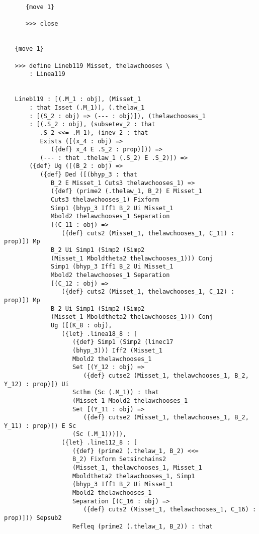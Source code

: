 \documentclass[12pt]{article}
\begin{document}
\begin{verbatim}
      {move 1}

      >>> close


   {move 1}

   >>> define Lineb119 Misset, thelawchooses \
       : Linea119


   Lineb119 : [(.M_1 : obj), (Misset_1 
       : that Isset (.M_1)), (.thelaw_1 
       : [(S_2 : obj) => (--- : obj)]), (thelawchooses_1 
       : [(.S_2 : obj), (subsetev_2 : that 
          .S_2 <<= .M_1), (inev_2 : that 
          Exists ([(x_4 : obj) => 
             ({def} x_4 E .S_2 : prop)])) => 
          (--- : that .thelaw_1 (.S_2) E .S_2)]) => 
       ({def} Ug ([(B_2 : obj) => 
          ({def} Ded ([(bhyp_3 : that 
             B_2 E Misset_1 Cuts3 thelawchooses_1) => 
             ({def} (prime2 (.thelaw_1, B_2) E Misset_1 
             Cuts3 thelawchooses_1) Fixform 
             Simp1 (bhyp_3 Iff1 B_2 Ui Misset_1 
             Mbold2 thelawchooses_1 Separation 
             [(C_11 : obj) => 
                ({def} cuts2 (Misset_1, thelawchooses_1, C_11) : prop)]) Mp 
             B_2 Ui Simp1 (Simp2 (Simp2 
             (Misset_1 Mboldtheta2 thelawchooses_1))) Conj 
             Simp1 (bhyp_3 Iff1 B_2 Ui Misset_1 
             Mbold2 thelawchooses_1 Separation 
             [(C_12 : obj) => 
                ({def} cuts2 (Misset_1, thelawchooses_1, C_12) : prop)]) Mp 
             B_2 Ui Simp1 (Simp2 (Simp2 
             (Misset_1 Mboldtheta2 thelawchooses_1))) Conj 
             Ug ([(K_8 : obj), 
                ({let} .linea18_8 : [
                   ({def} Simp1 (Simp2 (linec17 
                   (bhyp_3))) Iff2 (Misset_1 
                   Mbold2 thelawchooses_1 
                   Set [(Y_12 : obj) => 
                      ({def} cutse2 (Misset_1, thelawchooses_1, B_2, Y_12) : prop)]) Ui 
                   Scthm (Sc (.M_1)) : that 
                   (Misset_1 Mbold2 thelawchooses_1 
                   Set [(Y_11 : obj) => 
                      ({def} cutse2 (Misset_1, thelawchooses_1, B_2, Y_11) : prop)]) E Sc 
                   (Sc (.M_1)))]), 
                ({let} .line112_8 : [
                   ({def} (prime2 (.thelaw_1, B_2) <<= 
                   B_2) Fixform Setsinchains2 
                   (Misset_1, thelawchooses_1, Misset_1 
                   Mboldtheta2 thelawchooses_1, Simp1 
                   (bhyp_3 Iff1 B_2 Ui Misset_1 
                   Mbold2 thelawchooses_1 
                   Separation [(C_16 : obj) => 
                      ({def} cuts2 (Misset_1, thelawchooses_1, C_16) : prop)])) Sepsub2 
                   Refleq (prime2 (.thelaw_1, B_2)) : that 

\end{verbatim}
\end{document}
